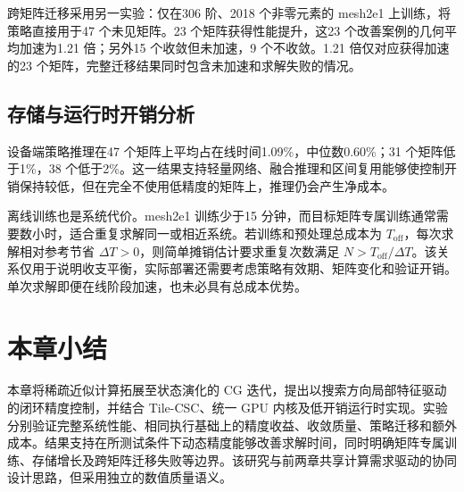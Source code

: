 跨矩阵迁移采用另一实验：仅在306 阶、2018 个非零元素的 mesh2e1 上训练，将策略直接用于47 个未见矩阵。23 个矩阵获得性能提升，这23 个改善案例的几何平均加速为1.21 倍；另外15 个收敛但未加速，9 个不收敛。1.21 倍仅对应获得加速的23 个矩阵，完整迁移结果同时包含未加速和求解失败的情况。


\subsection{存储与运行时开销分析}
设备端策略推理在47 个矩阵上平均占在线时间1.09\%，中位数0.60\%；31 个矩阵低于1\%，38 个低于2\%。这一结果支持轻量网络、融合推理和区间复用能够使控制开销保持较低，但在完全不使用低精度的矩阵上，推理仍会产生净成本。


离线训练也是系统代价。mesh2e1 训练少于15 分钟，而目标矩阵专属训练通常需要数小时，适合重复求解同一或相近系统。若训练和预处理总成本为 $T_{\mathrm{off}}$，每次求解相对参考节省 $\Delta T>0$，则简单摊销估计要求重复次数满足 $N>T_{\mathrm{off}}/\Delta T$。该关系仅用于说明收支平衡，实际部署还需要考虑策略有效期、矩阵变化和验证开销。单次求解即便在线阶段加速，也未必具有总成本优势。



\section{本章小结}
本章将稀疏近似计算拓展至状态演化的 CG 迭代，提出以搜索方向局部特征驱动的闭环精度控制，并结合 Tile-CSC、统一 GPU 内核及低开销运行时实现。实验分别验证完整系统性能、相同执行基础上的精度收益、收敛质量、策略迁移和额外成本。结果支持在所测试条件下动态精度能够改善求解时间，同时明确矩阵专属训练、存储增长及跨矩阵迁移失败等边界。该研究与前两章共享计算需求驱动的协同设计思路，但采用独立的数值质量语义。
